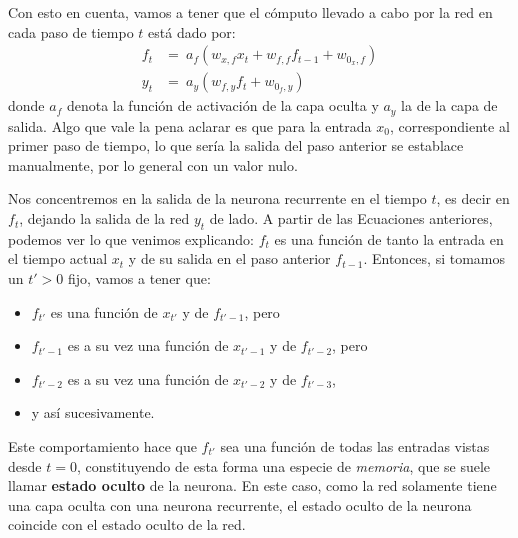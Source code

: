 \documentclass[../../main.tex]{subfiles}
\begin{document}
Con esto en cuenta, vamos a tener que el cómputo llevado a cabo por la red
en cada paso de tiempo \(t\) está dado por:
\begin{align}
    f_t &=\ a_f \left( w_{x,f} x_t  + w_{f,f} f_{t-1} + w_{0_x,f} \right) \label{eq:ft} \\
    y_t &=\ a_y \left( w_{f,y} f_t + w_{0_f, y} \right) \label{eq:yt}
\end{align}
donde \(a_f\) denota la función de activación de la capa oculta y \(a_y\) la de la capa de
salida. Algo que vale la pena aclarar es que para la entrada \(x_0\), correspondiente al
primer paso de tiempo, lo que sería la salida del paso anterior se establace manualmente,
por lo general con un valor nulo.

Nos concentremos en la salida de la neurona recurrente en el tiempo \(t\), es decir
en \(f_t\), dejando la salida de la red \(y_t\) de lado. A partir de las Ecuaciones
anteriores, podemos ver lo que venimos explicando: \(f_t\) es una función de
tanto la entrada en el tiempo actual \(x_t\) y de su salida en el paso anterior
\(f_{t-1}\). Entonces, si tomamos un \(t' > 0\) fijo, vamos a tener que:
\begin{itemize}[itemsep=0.05cm]
    \item \(f_{t'}\) es una función de \(x_{t'}\) y de \(f_{t'-1}\), pero
    \item \(f_{t'-1}\) es a su vez una función de \(x_{t'-1}\) y de \(f_{t'-2}\), pero
    \item \(f_{t'-2}\) es a su vez una función de \(x_{t'-2}\) y de \(f_{t'-3}\),
    \item y así sucesivamente.
\end{itemize}
Este comportamiento hace que \(f_{t'}\) sea una función de todas las entradas vistas desde
\(t=0\), constituyendo de esta forma una especie de \textit{memoria}, que se suele llamar
\textbf{estado oculto} de la neurona. En este caso, como la red solamente tiene una capa
oculta con una neurona recurrente, el estado oculto de la neurona coincide con el estado
oculto de la red.
\end{document}
